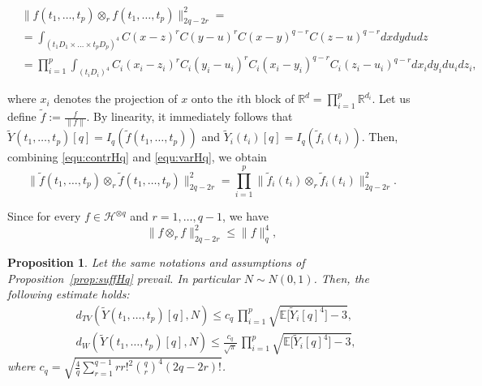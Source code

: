 \documentclass[10pt,a4paper]{amsart}
\newtheorem{proposition}{Proposition}
\newcommand{\E}{\mathbb{E}}
\begin{document}
    \begin{align} \label{equ:contrHq}
    & \|f{(t_1,\dots,t_p)} \otimes_r  f{(t_1,\dots,t_p)}\|_{{2q-2r}}^2 = \\
    & = \int_{(t_1D_1\times\dots\times t_pD_p)^4} C(x-z)^rC(y-u)^rC(x-y)^{q-r}C(z-u)^{q-r}dxdydudz  \\
    & =  \prod_{i=1}^p \int_{(t_iD_i)^4} C_i(x_i-z_i)^rC_i(y_i-u_i)^rC_i(x_i-y_i)^{q-r}C_i(z_i-u_i)^{q-r}dx_idy_idu_idz_i ,
\end{align}

where $x_i$ denotes the projection of $x$ onto the $i$th block of $\mathbb R^{d}=\prod_{i=1}^p\mathbb R^{d_i}$. Let us define $\tilde f:= \frac{f}{\|f\|}$. By linearity, it immediately follows that $\widetilde Y{(t_1,\dots,t_p)}[q]=I_q(\tilde f{(t_1,\dots,t_p)})$ and $\widetilde Y_i{(t_i)}[q]=I_q(\tilde f_i{(t_i)})$. Then, combining \eqref{equ:contrHq} and \eqref{equ:varHq}, we obtain \begin{equation}\label{equ:contr}
    \|\widetilde f{(t_1,\ldots,t_p)}\otimes_r \widetilde f{(t_1,\ldots,t_p)}\|_{2q-2r}^2 =  \prod_{i=1}^p  \|\widetilde f_i{(t_i)}\otimes_r \widetilde f_i(t_i)\|_{2q-2r}^2.
\end{equation}

Since for every $f\in \mathcal H^{\otimes q}$ and $r=1,\ldots,q-1$, we have \begin{equation}\label{equ:aiuto}
    \|f\otimes_r f\|_{2q-2r} ^2 \le \|f\|_{q}^4,
\end{equation}

\begin{proposition}\label{prop:quantHq}
    Let the same notations and assumptions of Proposition~\ref{prop:suffHq} prevail. In particular $N\sim N(0,1)$.
    Then, the following estimate holds: 
    \begin{align}\label{equ:quantHqLe}
        &d_{TV}(\widetilde Y{(t_1,\ldots,t_p)}[q],N)\le c_q \, \prod_{i=1}^p \sqrt{\E\big[\widetilde Y_i[q]^4\big]-3}, \\
        &{d_{W}(\widetilde Y{(t_1,\ldots,t_p)}[q],N)\le \frac{c_q}{\sqrt{\pi}} \, \prod_{i=1}^p \sqrt{\E\big[\widetilde Y_i[q]^4\big]-3},}
    \end{align}
    where $c_q=\sqrt{\frac{4}{q}\sum_{r=1}^{q-1}rr!^2\binom{q}{r}^4(2q-2r)!}$.
\end{proposition}
\end{document}
